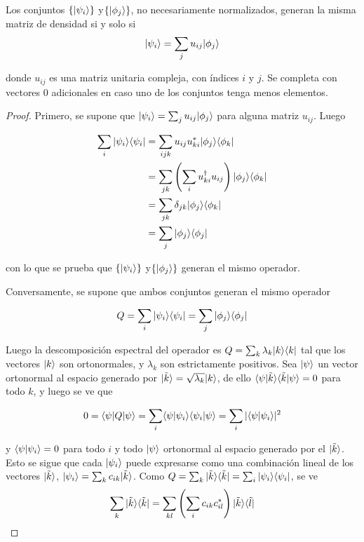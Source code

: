 \begin{theorem}
Los conjuntos $\{|\psi_i\rangle\}$ y$ \{|\phi_j\rangle \}$, no necesariamente normalizados, generan la misma matriz de densidad si y solo si
\begin{equation}\label{teorema2.4}
|\psi_i\rangle= \sum_{j}u_{ij}|\phi_j\rangle
\end{equation}

donde $u_{ij}$ es una matriz unitaria compleja, con índices $i$ y $j$. Se completa con vectores 0 adicionales en caso uno de los conjuntos tenga menos elementos.
\end{theorem}

\begin{proof}
	
	Primero, se supone que $|\psi_i\rangle= \sum_{j}u_{ij}|\phi_j\rangle$ para alguna matriz $u_{ij}$. Luego
	
	
	\begin{equation*}
		\begin{split}
			\sum_{i}|\psi_i\rangle \langle \psi_i|&=\sum_{ijk}u_{ij}u_{ki}^*|\phi_j\rangle \langle \phi_k|\\
			&=\sum_{jk}\left(\sum_i u_{ki}^\dagger u_{ij}\right) |\phi_j\rangle \langle \phi_k|\\
			&=\sum_{jk}\delta_{jk}|\phi_j\rangle \langle \phi_k|\\
			&=\sum_{j} |\phi_j\rangle \langle \phi_j|\\
	\end{split}
	\end{equation*}
	
	con lo que se prueba que $\{|\psi_i\rangle\}$ y$ \{|\phi_j\rangle \}$ generan el mismo operador.
	
	
	
	Conversamente, se supone que ambos conjuntos generan el mismo operador
	
	\[Q=\sum_{i}|\psi_i\rangle \langle \psi_i|=\sum_{j} |\phi_j\rangle \langle \phi_j|\]
	
	Luego la  descomposición espectral del operador es $Q = \sum_k \lambda_k |k \rangle \langle k|$ tal que los vectores $ |k\rangle$ son ortonormales, y $\lambda_k$ son estrictamente  positivos. Sea $|\psi\rangle$  un vector ortonormal al espacio generado por $|\tilde{k}\rangle=\sqrt{\lambda_k}|k\rangle$, de ello $\langle \psi|\tilde{k}\rangle \langle \tilde{k}|\psi\rangle=0$ para todo $ k$, y luego se ve que
	
	\[0=\langle \psi |Q|\psi\rangle=\sum_{i}\langle\psi|\psi_i\rangle \langle \psi_i|\psi \rangle =\sum_i |\langle\psi|\psi_i\rangle|^2 \]
	
	y $\langle\psi|\psi_i\rangle=0$ para todo $i$ y todo $|\psi \rangle$ ortonormal al espacio generado  por el $|\tilde{k}\rangle$. Esto se sigue que cada $|\psi_i\rangle $ puede expresarse como una combinación lineal de los vectores  $|\tilde{k}\rangle$, $|\psi_i\rangle=\sum_k c_{ik} |\tilde{k}\rangle$. Como  $Q=\sum_k  |\tilde{k}\rangle \langle \tilde{k}|=\sum_{i}|\psi_i\rangle \langle\psi_i|$, se ve
	\[\sum_k |\tilde{k}\rangle \langle \tilde{k}|=\sum_{kl} \left(\sum_i c_{ik}c_{il}^{*}\right)|\tilde{k}\rangle \langle \tilde{l}|\]
	

\end{proof}

